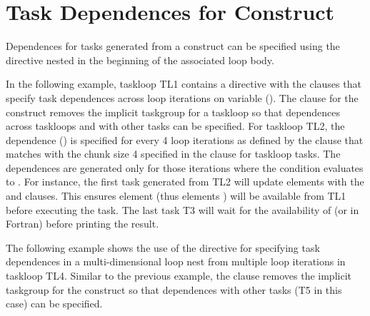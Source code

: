 \section{Task Dependences for  Construct}
\label{sec:taskloop_depend}


Dependences for tasks generated from a  construct can
be specified using the  directive nested in
the beginning of the associated loop body.

In the following example, taskloop TL1 contains
a  directive with the  clauses
that specify task dependences across loop iterations on variable 
().
The  clause for the  construct removes 
the implicit taskgroup for a taskloop so that dependences across taskloops and 
with other tasks can be specified.
For taskloop TL2, the dependence ()
is specified for every 4 loop iterations
as defined by the  clause that matches with
the chunk size 4 specified in the  clause for taskloop tasks.
The dependences are generated only for those iterations where
the  condition evaluates to .
For instance, the first task generated from TL2 will update elements
 with the 
and  clauses. This ensures element 
(thus elements ) will be available from TL1 before executing
the task.
The last task T3 will wait for the availability of 
(or  in Fortran) before printing the result.



The following example shows the use of the 
directive for specifying task dependences in a multi-dimensional loop nest
from multiple loop iterations in taskloop TL4.
Similar to the previous example, the  clause removes
the implicit taskgroup for the  construct so that 
dependences with other tasks (T5 in this case) can be specified.


